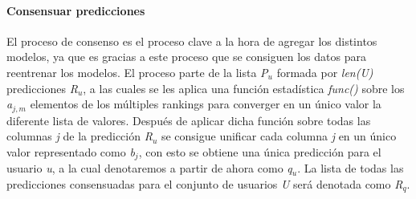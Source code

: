 \paragraph{Consensuar predicciones} El proceso de consenso es el proceso clave a la hora de agregar los distintos modelos, ya que es gracias a este proceso que se consiguen los datos para reentrenar los modelos. El proceso parte de la lista \textit{P$_{u}$} formada por \textit{len(U)} predicciones \textit{R$_{u}$}, a las cuales se les aplica una función estadística \textit{func()} sobre los \textit{a$_{j, m}$} elementos de los múltiples rankings para converger en un único valor la diferente lista de valores. Después de aplicar dicha función sobre todas las columnas \textit{j} de la predicción \textit{R$_{u}$} se consigue unificar cada columna \textit{j} en un único valor representado como \textit{b$_{j}$}, con esto se obtiene una única predicción para el usuario \textit{u}, a la cual denotaremos a partir de ahora como \textit{q$_{u}$}. La lista de todas las predicciones consensuadas para el conjunto de usuarios \textit{U} será denotada como \textit{R$_{q}$}.

